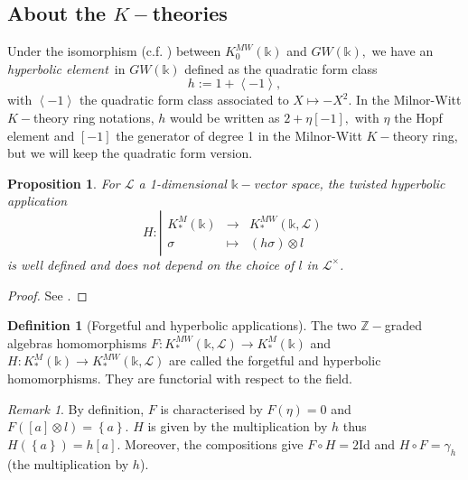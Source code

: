 \documentclass{amsart}
\theoremstyle{plain}%
\newtheorem{prop}[subsubsection]{Proposition}
\theoremstyle{remark}
\newtheorem{rmq}[subsubsection]{Remark}
\theoremstyle{definition}
\newtheorem{deff}[subsubsection]{Definition}
\newcommand{\cL}{\mathcal{L}}
\newcommand{\ek}{\mathbb{k}}
\newcommand{\eZ}{\mathbb{Z}}
\newcommand{\GW}{GW}
\newcommand{\KMW}[2][\ast]{K^{MW}_{#1}\left( #2 \right)}
\newcommand{\qscal}[1]{\left\langle #1 \right\rangle}
\newcommand{\Id}{\mathrm{Id}}
\newcommand{\accol}[1]{\left\{#1\right\}}
\begin{document}
\subsection{About the $K-$theories}

Under the isomorphism (c.f. \cite[Lemma 3.10]{Morel_A1-alg-top}) between $K^{MW}_0(\ek)$ and $\GW(\ek),$ we have an \emph{hyperbolic element}\ in $\GW(\ek)$ defined as the quadratic form class
\[h := 1 + \qscal{-1},\]
with $\qscal{-1}$ the quadratic form class associated to $X \mapsto -X^2.$ In the Milnor-Witt $K-$theory ring notations, $h$ would be written as $2 + \eta [-1],$ with $\eta$ the Hopf element and $[-1]$ the generator of degree 1 in the Milnor-Witt $K-$theory ring, but we will keep the quadratic form version.


\begin{prop}\label{PROP - foncteur H bien def indep torsion}
For $\cL$ a 1-dimensional $\ek-$vector space, the twisted hyperbolic application
\[H:\left| \begin{array}{ccc}
     K^M_\ast(\ek)& \to& \KMW{\ek,\cL} \\
    \sigma & \mapsto & (h\sigma)\otimes l 
\end{array}\right. \]
is well defined and does not depend on the choice of $l$ in $\cL^\times$.
\end{prop}

\begin{proof}
See \cite[Proposition 3.2.4]{Cha_dP2-4}.
\end{proof}



\begin{deff}[Forgetful and hyperbolic applications]\label{DEF - applications oubli et hyperbolique}
The two $\eZ-$graded algebras homomorphisms $F: \KMW{\ek,\cL} \to K^M_\ast(\ek)$ and $H: K^M_\ast(\ek) \to \KMW{\ek,\cL}$ %
are called the forgetful and hyperbolic homomorphisms. They are functorial with respect to the field.
\end{deff}


\begin{rmq}
By definition, $F$ is characterised by $F(\eta) = 0$ and $F([a]\otimes l) = \accol{a}$. $H$ is given by the multiplication by $h$ thus $H(\accol{a}) = h[a]$. Moreover, the compositions give $F\circ H = 2 \Id$ and $H \circ F = \gamma_h$ (the multiplication by $h$). 
\end{rmq}
\end{document}
